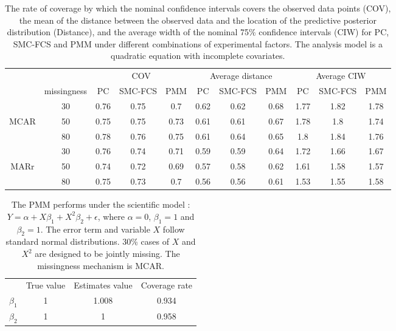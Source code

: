 \documentclass[12pt, fullpage, a4paper]{article}
\begin{document}
\begin{table}
	\begin{tabular}{cc|ccc|ccc|ccc}
		\multicolumn{2}{l}{}                    & \multicolumn{3}{c|}{COV} & \multicolumn{3}{c|}{Average distance} & \multicolumn{3}{c}{Average CIW} \\ \cline{2-11} 
		\multicolumn{1}{c|}{}     & missingness & PC    & SMC-FCS  & PMM   & PC         & SMC-FCS      & PMM       & PC       & SMC-FCS    & PMM     \\
		\multicolumn{1}{c|}{}     & 30          & 0.76  & 0.75     & 0.7   & 0.62       & 0.62         & 0.68      & 1.77     & 1.82       & 1.78    \\
		\multicolumn{1}{c|}{MCAR} & 50          & 0.75  & 0.75     & 0.73  & 0.61       & 0.61         & 0.67      & 1.78     & 1.8        & 1.74    \\
		\multicolumn{1}{c|}{}     & 80          & 0.78  & 0.76     & 0.75  & 0.61       & 0.64         & 0.65      & 1.8      & 1.84       & 1.76    \\ \hline
		\multicolumn{1}{c|}{}     & 30          & 0.76  & 0.74     & 0.71  & 0.59       & 0.59         & 0.64      & 1.72     & 1.66       & 1.67    \\
		\multicolumn{1}{c|}{MARr} & 50          & 0.74  & 0.72     & 0.69  & 0.57       & 0.58         & 0.62      & 1.61     & 1.58       & 1.57    \\
		\multicolumn{1}{c|}{}     & 80          & 0.75  & 0.73     & 0.7   & 0.56       & 0.56         & 0.61      & 1.53     & 1.55       & 1.58   
	\end{tabular}
	\caption{The rate of coverage by which the nominal confidence intervals covers the observed data points (COV), the mean of the distance between the observed data and the location of the predictive posterior distribution (Distance), and the average width of the nominal 75\% confidence intervals (CIW) for PC, SMC-FCS and PMM under different combinations of experimental factors. The analysis model is a quadratic equation with incomplete covariates.}
	\label{tab6_3}
\end{table}

\begin{table}[ht!]
	\begin{tabular}{cccc}
		& True value & Estimates value & Coverage rate \\
		$\beta_1$ & 1          & 1.008           & 0.934         \\
		$\beta_2$ & 1          & 1               & 0.958        
	\end{tabular}
	\caption{The PMM performs under the scientific model : $Y = \alpha + X\beta_{1} + X^2\beta_{2} +\epsilon$, where $\alpha = 0$, $\beta_{1} = 1$ and $\beta_{2} = 1$. The error term and variable $X$ follow standard normal distributions. 30\% cases of $X$ and $X^2$ are designed to be jointly missing. The missingness mechanism is MCAR.}
	\label{tab6_4}
\end{table}
\end{document}

